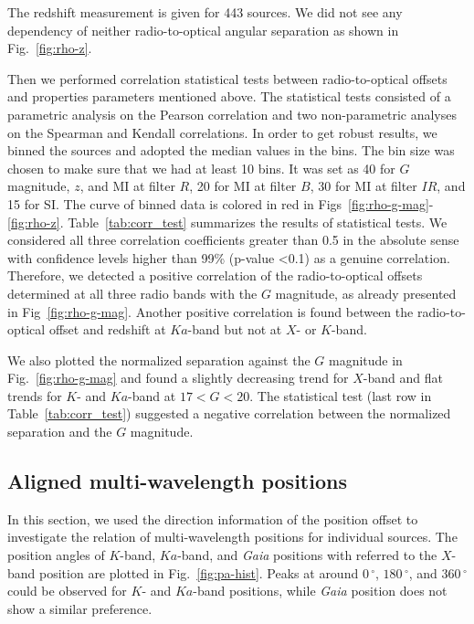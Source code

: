 \documentclass{aa}
\begin{document}
    The redshift measurement is given for 443 sources.
    We did not see any dependency of neither radio-to-optical angular separation as shown in Fig.~\ref{fig:rho-z}.

     Then we performed correlation statistical tests between radio-to-optical offsets and properties parameters mentioned above.
     The statistical tests consisted of a parametric analysis on the Pearson correlation and two non-parametric analyses on the Spearman and Kendall correlations.
     In order to get robust results, we binned the sources and adopted the median values in the bins.
     The bin size was chosen to make sure that we had at least 10 bins.
     It was set as 40 for $G$ magnitude, $z$, and MI at filter $R$, 20 for MI at filter $B$, 30 for MI at filter $IR$, and 15 for SI.
     The curve of binned data is colored in red in Figs~\ref{fig:rho-g-mag}-\ref{fig:rho-z}.
     Table~\ref{tab:corr_test} summarizes the results of statistical tests.
     We considered all three correlation coefficients greater than 0.5 in the absolute sense with confidence levels higher than 99\% (p-value <0.1) as a genuine correlation.
     Therefore, we detected a positive correlation of the radio-to-optical offsets determined at all three radio bands with the $G$ magnitude, as already presented in Fig~\ref{fig:rho-g-mag}.
     Another positive correlation is found between the radio-to-optical offset and redshift at $Ka$-band but not at $X$- or $K$-band.

     We also plotted the normalized separation against the $G$ magnitude in Fig.~\ref{fig:rho-g-mag} and found a slightly decreasing trend for $X$-band and flat trends for $K$- and $Ka$-band at $17<G<20$.
     The statistical test (last row in Table~\ref{tab:corr_test}) suggested a negative correlation between the normalized separation and the $G$ magnitude.


\subsection{Aligned multi-wavelength positions}    \label{subsec:pos-align}


    In this section, we used the direction information of the position offset to investigate the relation of multi-wavelength positions for individual sources.
    The position angles of $K$-band, $Ka$-band, and \textit{Gaia} positions with referred to the $X$-band position are plotted in Fig.~\ref{fig:pa-hist}.
    Peaks at around $0\,^\circ$, $180\,^\circ$, and $360\,^\circ$ could be observed for $K$- and $Ka$-band positions, while \textit{Gaia} position does not show a similar preference.
\end{document}
